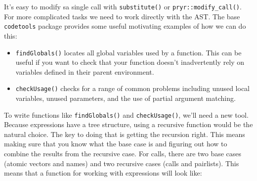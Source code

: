 
It's easy to modify sa single call with \texttt{substitute()} or
\texttt{pryr::modify\_call()}. For more complicated tasks we need to
work directly with the AST. The base \texttt{codetools} package provides
some useful motivating examples of how we can do this:

\begin{itemize}
\item
  \texttt{findGlobals()} locates all global variables used by a
  function. This can be useful if you want to check that your function
  doesn't inadvertently rely on variables defined in their parent
  environment.
\item
  \texttt{checkUsage()} checks for a range of common problems including
  unused local variables, unused parameters, and the use of partial
  argument matching.
\end{itemize}

To write functions like \texttt{findGlobals()} and
\texttt{checkUsage()}, we'll need a new tool. Because expressions have a
tree structure, using a recursive function would be the natural choice.
The key to doing that is getting the recursion right. This means making
sure that you know what the base case is and figuring out how to combine
the results from the recursive case. For calls, there are two base cases
(atomic vectors and names) and two recursive cases (calls and
pairlists). This means that a function for working with expressions will
look like:

\begin{Shaded}
\begin{Highlighting}[]
\StringTok{ }
    \NormalTok{(}\NormalTok{, }
       \NormalTok{)}
  \NormalTok{\}}
\NormalTok{\}}
\end{Highlighting}
\end{Shaded}

